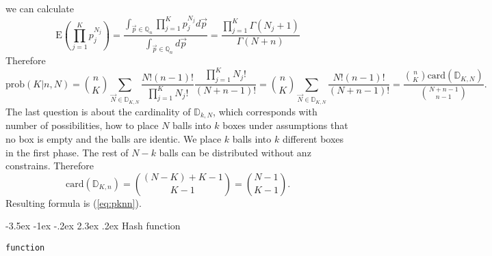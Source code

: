 \documentclass[a4paper,10pt]{article}
\makeatletter
\renewcommand\section{\@startsection {section}{1}{\z@}%
                                   {-3.5ex \@plus -1ex \@minus -.2ex}%
                                   {2.3ex \@plus.2ex}%
                                   {\large\bfseries}}
\makeatother
\begin{document}
\begin{appendices}
\begin{equation}
\end{equation}
we can calculate
\begin{equation} 
\label{eq:expprod}
\text{E}(\prod_{j=1}^{K}p_{j}^{N_{j}}) = \frac{\int_{\vec{p} \in \mathbb{Q}_{n}} \prod_{j=1}^{K} p_{j}^{N_{j}} d\vec{p}}{\int_{\vec{p} \in \mathbb{Q}_{n}} d\vec{p}} = \frac{\prod_{j=1}^{K}\Gamma(N_{j}+1)}{\Gamma(N+n)}
\end{equation}
Therefore
\begin{equation} 
\label{eq:prob}
\text{prob}(K|n,N) = {n \choose K}\sum_{\vec{N} \in \mathbb{D}_{K,N}} \frac{N!(n-1)!}{\prod_{j=1}^{K}N_{j}!}\frac{\prod_{j=1}^{K}N_{j}!}{(N+n-1)!} = {n \choose K}\sum_{\vec{N} \in \mathbb{D}_{K,N}} \frac{N!(n-1)!}{(N+n-1)!} = \frac{{n \choose K}\text{card}(\mathbb{D}_{K,N})}{{N+n-1 \choose n-1}}.
\end{equation}
The last question is about the cardinality of $\mathbb{D}_{k,N}$, which corresponds with number of possibilities, how to place $N$ balls into $k$ boxes under assumptions that no box is empty and the balls are identic. We place $k$ balls into $k$ different boxes in the first phase. The rest of $N-k$ balls can be distributed without anz constrains. Therefore
\begin{equation} 
\label{eq:card}
\text{card}(\mathbb{D}_{K,n}) = {(N-K)+K-1 \choose K-1} = {N-1 \choose K-1}. 
\end{equation}
Resulting formula is (\ref{eq:pknn}).

\normalfont
\section {Hash function}
\ttfamily
\begin{lstlisting}
function 
\end{lstlisting}

\end{appendices}
\end{document}
